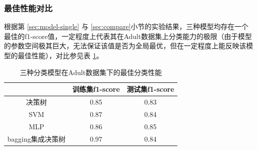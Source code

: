 \documentclass[12pt,a4paper]{article}
\theoremstyle{definition}
\begin{document}

\subsubsection{最佳性能对比}

根据第 \ref{sec:model-single} 与 \ref{sec:compare}小节的实验结果，三种模型均存在一个最佳的f1-score值，一定程度上代表其在Adult数据集上分类能力的极限（由于模型的参数空间极其巨大，无法保证该值是否为全局最优，但在一定程度上能反映该模型的最佳性能），对比参见表 \ref{tab:final_compare}。

\begin{table}[H]
	\renewcommand\arraystretch{1.35}
	\caption{三种分类模型在Adult数据集下的最佳分类性能}
	\label{tab:final_compare}
	\centering
	
	\begin{tabular}{c|c|c}
		\centering
		 & 训练集f1-score & 测试集f1-score \\
		\hline
		\hline
		
		决策树 & 0.85 & 0.83 \\
		SVM & 0.87 & 0.84 \\
		MLP & 0.86 & 0.85 \\
		bagging集成决策树 & 0.97 & 0.84 \\

	\end{tabular}
\end{table}

\end{document}
